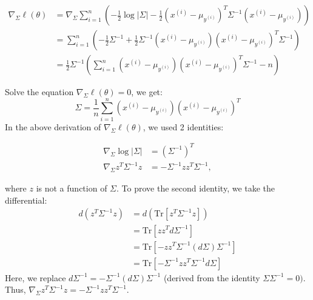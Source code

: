 \begin{answer}
\begin{align}
	\nabla_{\Sigma}\ell(\theta) 
	&= \nabla_{\Sigma} \sum \limits_{i = 1}^{n} \left(- \frac{1}{2}\log |\Sigma| - \frac{1}{2}(x^{(i)} - \mu_{y^{(i)}})^T \Sigma^{-1} (x^{(i)} - \mu_{y^{(i)}}) \right) \\
	&= \sum \limits_{i = 1}^{n} \left( -\frac{1}{2} \Sigma^{-1} + \frac{1}{2}  \Sigma^{-1} (x^{(i)} - \mu_{y^{(i)}}) (x^{(i)} - \mu_{y^{(i)}})^T \Sigma^{-1} \right) \\
	&= \frac{1}{2} \Sigma^{-1}\left( \sum \limits_{i = 1}^{n} (x^{(i)} - \mu_{y^{(i)}}) (x^{(i)} - \mu_{y^{(i)}})^T \Sigma^{-1} - n \right)
\end{align}

Solve the equation $\nabla_{\Sigma} \ell(\theta) = 0$, we get:
$$\widehat\Sigma = \frac{1}{n} \sum \limits_{i = 1}^{n} (x^{(i)} - \mu_{y^{(i)}}) (x^{(i)} - \mu_{y^{(i)}})^T$$
In the above derivation of $\nabla_{\Sigma} \ell(\theta)$, we used 2 identities:

\begin{align}
\nabla_{\Sigma}\log|\Sigma| &= (\Sigma^{-1})^T \\
\nabla_{\Sigma} z^T\Sigma^{-1} z &= -\Sigma^{-1} z z^T \Sigma^{-1}, 
\end{align}

where $z$ is not a function of $\Sigma$. To prove the second identity, we take the differential:
\begin{align}
	d(z^T \Sigma^{-1} z) 
	&= d(\text{Tr}[z^T \Sigma^{-1} z]) \\
	&= \text{Tr}[z z^T d\Sigma^{-1}] \\
	&= \text{Tr}[-z z^T \Sigma^{-1} (d\Sigma) \Sigma^{-1}] \\
	&= \text{Tr}[-\Sigma^{-1} z z^T \Sigma^{-1} d\Sigma]
\end{align}
Here, we replace $ d\Sigma^{-1} = -\Sigma^{-1}(d\Sigma)\Sigma^{-1} $ (derived from the identity $\Sigma \Sigma^{-1} = 0)$. Thus, $\nabla_{\Sigma} z^T\Sigma^{-1} z = -\Sigma^{-1} z z^T \Sigma^{-1}$. \\
\end{answer}
